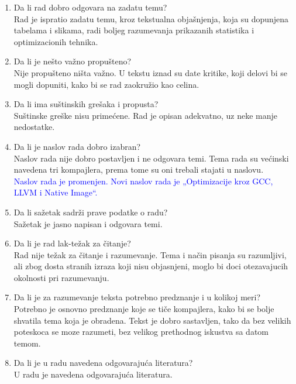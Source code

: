 \documentclass[a4paper]{report}
\newcommand{\odgovor}[1]{\textcolor{blue}{#1}}
\begin{document}
\begin{enumerate}
\item Da li rad dobro odgovara na zadatu temu?\\
Rad je ispratio zadatu temu, kroz tekstualna objašnjenja, koja su dopunjena tabelama i slikama, radi boljeg razumevanja prikazanih statistika i optimizacionih tehnika.

\item Da li je nešto važno propušteno?\\
Nije propušteno ništa važno. U tekstu iznad su date kritike, koji delovi bi se mogli dopuniti, kako bi se rad zaokružio kao celina.

\item Da li ima suštinskih grešaka i propusta?\\
Suštinske greške nisu primećene. Rad je opisan adekvatno, uz neke manje nedostatke.

\item Da li je naslov rada dobro izabran?\\
Naslov rada nije dobro postavljen i ne odgovara temi. Tema rada su većinski navedena tri kompajlera, prema tome su oni trebali stajati u naslovu. \\
\odgovor{Naslov rada je promenjen. Novi naslov rada je „Optimizacije kroz GCC, LLVM i Native Image“.}

\item Da li sažetak sadrži prave podatke o radu?\\
Sažetak je jasno napisan i odgovara temi.

\item Da li je rad lak-težak za čitanje?\\
Rad nije težak za čitanje i razumevanje. Tema i način pisanja su razumljivi, ali zbog dosta stranih izraza koji nisu objasnjeni, moglo bi doci otezavajucih okolnosti pri razumevanju.

\item Da li je za razumevanje teksta potrebno predznanje i u kolikoj meri?\\
Potrebno je osnovno predznanje koje se tiče kompajlera, kako bi se bolje shvatila tema koja je obradena. Tekst je dobro sastavljen, tako da bez velikih poteskoca se moze razumeti, bez velikog prethodnog iskustva sa datom temom.

\item Da li je u radu navedena odgovarajuća literatura?\\
U radu je navedena odgovarajuća literatura.


\end{enumerate}
\end{document}
